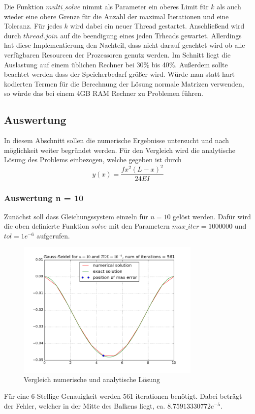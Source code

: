 \documentclass[12pt,titlepage]{article}
\begin{document}
		\newline \newline
		Die Funktion $multi\_solve$	nimmt als Parameter ein oberes Limit für $k$ als auch wieder eine obere Grenze für die Anzahl der maximal Iterationen und eine Toleranz. Für jedes $k$ wird dabei ein neuer Thread gestartet. Anschließend wird durch $thread.join$ auf die beendigung eines jeden Trheads gewartet.
		Allerdings hat diese Implementierung den Nachteil, dass nicht darauf geachtet wird ob alle verfügbaren Resourcen der Prozessoren genutz werden. Im Schnitt liegt die Auslastung auf einem üblichen Rechner bei 30\% bis 40\%.
		Außerdem sollte beachtet werden dass der Speicherbedarf größer wird. Würde man statt hart kodierten Termen für die Berechnung der Lösung normale Matrizen verwenden, so würde das bei einem 4GB RAM Rechner zu Problemen führen.	
		
	\subsection{Auswertung}
		In diesem Abschnitt sollen die numerische Ergebnisse untersucht und nach möglichkeit weiter begründet werden.
		Für den Vergleich wird die analytische Lösung des Problems einbezogen, welche gegeben ist durch
		\begin{equation}
			y(x) = \frac{fx^2(L-x)^2}{24EI}
		\end{equation}
		
		\newpage
		\subsubsection{Auswertung n = 10}
			Zunächst soll dass Gleichungssystem einzeln für $n=10$ gelöst werden. Dafür wird die oben definierte
		 	Funktion $solve$ mit den Parametern $max\_iter=1000000$ und $tol=1e^{-6}$ aufgerufen.
		 	
		 	\begin{figure}[H] 
	 			\centering
	 			\includegraphics[width=0.8\textwidth]{n_10.png}
	 			\caption{Vergleich numerische und analytische Lösung}
	 			\label{fig:Bild1}
	 		\end{figure}
	 		Für eine 6-Stellige Genauigkeit werden 561 iterationen benötigt. Dabei beträgt der Fehler, welcher in der Mitte des Balkens liegt, ca.
	 		$8.75913330772e^{-5}$.
	 	
\end{document}
